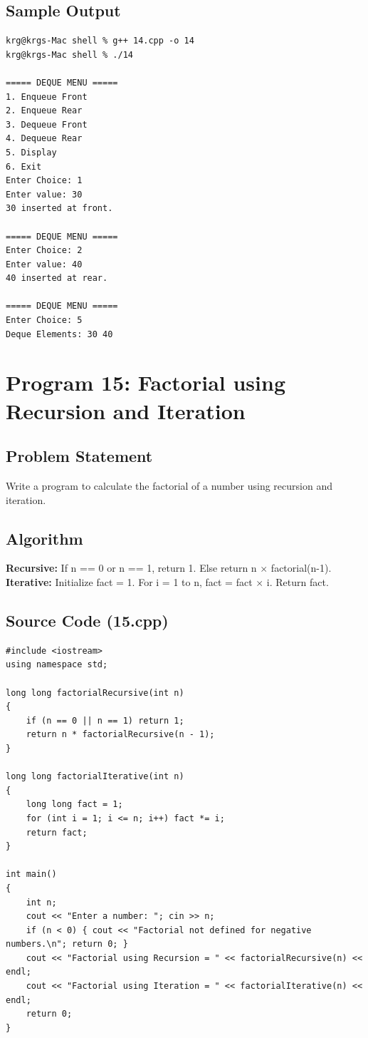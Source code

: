 \documentclass[a4paper,12pt]{article}
\begin{document}
\subsection*{Sample Output}
\begin{lstlisting}[style=outputstyle]
krg@krgs-Mac shell % g++ 14.cpp -o 14
krg@krgs-Mac shell % ./14

===== DEQUE MENU =====
1. Enqueue Front
2. Enqueue Rear
3. Dequeue Front
4. Dequeue Rear
5. Display
6. Exit
Enter Choice: 1
Enter value: 30
30 inserted at front.

===== DEQUE MENU =====
Enter Choice: 2
Enter value: 40
40 inserted at rear.

===== DEQUE MENU =====
Enter Choice: 5
Deque Elements: 30 40 
\end{lstlisting}

\newpage

\section*{Program 15: Factorial using Recursion and Iteration}

\subsection*{Problem Statement}
Write a program to calculate the factorial of a number using recursion and iteration.

\subsection*{Algorithm}
\textbf{Recursive:} If n == 0 or n == 1, return 1. Else return n $\times$ factorial(n-1).\\
\textbf{Iterative:} Initialize fact = 1. For i = 1 to n, fact = fact $\times$ i. Return fact.

\subsection*{Source Code (15.cpp)}
\begin{lstlisting}[style=cppstyle]
#include <iostream>
using namespace std;

long long factorialRecursive(int n)
{
    if (n == 0 || n == 1) return 1;
    return n * factorialRecursive(n - 1);
}

long long factorialIterative(int n)
{
    long long fact = 1;
    for (int i = 1; i <= n; i++) fact *= i;
    return fact;
}

int main()
{
    int n;
    cout << "Enter a number: "; cin >> n;
    if (n < 0) { cout << "Factorial not defined for negative numbers.\n"; return 0; }
    cout << "Factorial using Recursion = " << factorialRecursive(n) << endl;
    cout << "Factorial using Iteration = " << factorialIterative(n) << endl;
    return 0;
}
\end{lstlisting}
\end{document}
